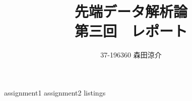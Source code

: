 \documentclass[dvipdfmx, fleqn, titlepage]{jsarticle}
\title{
	先端データ解析論 \\
	第三回　レポート
	}
\author{37-196360 \quad 森田涼介}
\begin{document}
\maketitle

{assignment1}
{assignment2}
\newpage
{listings}
\end{document}
